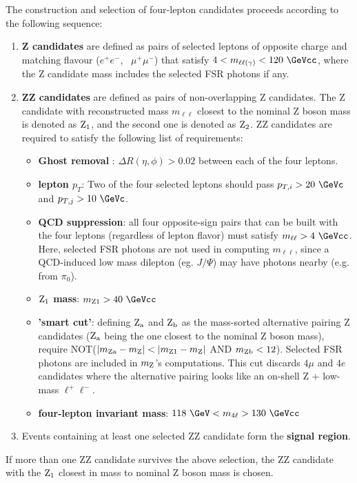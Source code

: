 The construction and selection of four-lepton candidates proceeds 
according to the following sequence:
\begin{enumerate}
\item {\bf Z candidates} are defined as pairs of selected leptons
 of opposite charge and matching flavour ($e^+ e^-$, \, $\mu^+\mu^-$)
 that satisfy $4 < m_{\ell\ell(\gamma)} < 120~\GeVcc$, where the Z candidate mass
 includes the selected FSR photons if any.
\item {\bf ZZ candidates} are defined as pairs of non-overlapping Z candidates.
 The Z candidate with reconstructed mass $m_{\ell\ell}$ closest to the nominal Z boson
 mass is denoted as ${\rm Z_1}$, and the second one is denoted as ${\rm Z_2}$.
 ZZ candidates are required to satisfy the following list of requirements:
  \begin{itemize} 
  \item {\bf Ghost removal }: $\Delta R(\eta,\phi) > 0.02$ between each of the four leptons.
  \item {\bf lepton $p_T$}: Two of the four selected leptons should pass 
     $p_{T,i} > 20~\GeVc$ and $p_{T,j} > 10~\GeVc$.
  \item {\bf QCD suppression}: all four opposite-sign pairs that can
     be built with the four leptons (regardless of lepton flavor)
     must satisfy $m_{\ell\ell} > 4~\GeVcc$.
     Here, selected FSR photons are not used in computing $m_{\ell\ell}$, 
     since a QCD-induced low mass dilepton (eg. $J/\Psi$) 
     may have photons nearby (e.g. from $\pi_0$). 
  \item {\bf ${\rm Z_1}$ mass}: $m_{\rm Z1} > 40~\GeVcc$
  \item {\bf 'smart cut'}: defining ${\rm Z_a}$ and ${\rm Z_b}$ as 
     the mass-sorted alternative pairing Z candidates 
     (${\rm Z_a}$ being the one closest to the nominal Z boson mass),
     require NOT($|m_{\rm Za}-m_{\rm Z}| < |m_{\rm Z1}-m_{\rm Z}|$ AND $m_{\rm Zb}<12$).
     Selected FSR photons are included in $m_{\rm Z}$'s computations.
     This cut discards $4\mu$ and $4e$ candidates where the alternative pairing
     looks like an on-shell Z + low-mass $\ell^+ \ell^-$. 
  \item {\bf four-lepton invariant mass}: $118~\GeV < \mass{4\ell} > 130~\GeVcc$
  \end{itemize}	
\item Events containing at least one selected ZZ candidate form the {\bf signal region}.
\end{enumerate}	

If more than one ZZ candidate survives the above selection, the ZZ candidate with the ${\rm Z_1}$ closest in 
mass to nominal Z boson mass is chosen.

